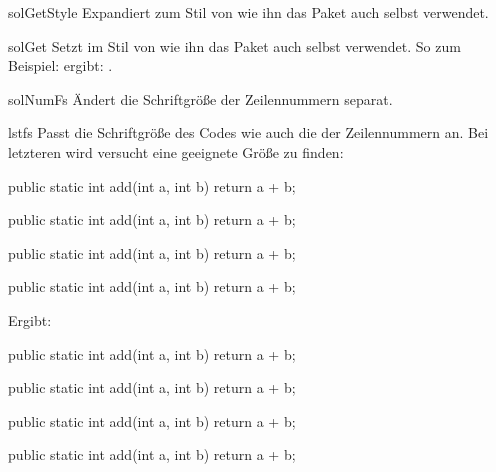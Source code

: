 \documentclass{sopra-base}
\begin{document}
\begin{command}{solGetStyle}{}
    Expandiert zum Stil von  wie ihn das Paket auch selbst verwendet.
\end{command}

\begin{command}{solGet}{}
    Setzt  im Stil von  wie ihn das Paket auch selbst verwendet. So zum Beispiel:  ergibt: .
\end{command}

\begin{command}{solNumFs}{}
    Ändert die Schriftgröße der Zeilennummern separat.
\end{command}

\begin{command}{lstfs}{}
    Passt die Schriftgröße des Codes wie auch die der Zeilennummern an. Bei letzteren wird versucht eine geeignete Größe zu finden:
\begin{latex}[morekeywords={[5]{\\lstfs}}]
\begin{java}
public static int add(int a, int b){ return a + b; }
\end{java}
{
\begin{java}
public static int add(int a, int b){ return a + b; }
\end{java}
}
\begin{java}
public static int add(int a, int b){ return a + b; }
\end{java}
{\tiny
\begin{java}
public static int add(int a, int b){ return a + b; }
\end{java}
}
\end{latex}
Ergibt:
\begin{java}
public static int add(int a, int b){ return a + b; }
\end{java}
{
\begin{java}
public static int add(int a, int b){ return a + b; }
\end{java}
}
\begin{java}
public static int add(int a, int b){ return a + b; }
\end{java}
{\tiny
\begin{java}
public static int add(int a, int b){ return a + b; }
\end{java}
}
\end{command}
\end{document}

